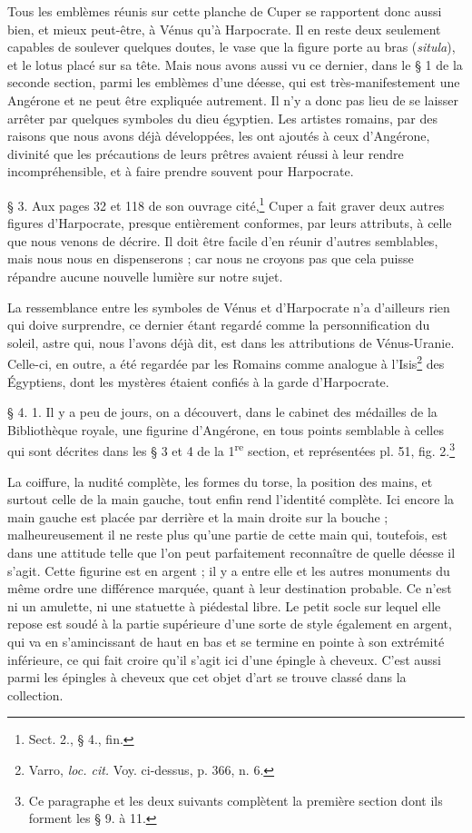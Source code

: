 \documentclass[a4paper, 11pt, oneside, polutonikogreek, french]{article}
\begin{document}
Tous les emblèmes réunis sur cette planche de Cuper se rapportent donc aussi bien, et mieux peut-être, à Vénus qu'à Harpocrate. Il en reste deux seulement capables de soulever quelques doutes, le vase que la figure porte au bras (\emph{situla}), et le lotus placé sur sa tête. Mais nous avons aussi vu ce dernier, dans le § 1 de la seconde section, parmi les emblèmes d'une déesse, qui est très-manifestement une Angérone et ne peut être expliquée autrement. Il n'y a donc pas lieu de se laisser arrêter par quelques symboles du dieu égyptien. Les artistes romains, par des raisons que nous avons déjà développées, les ont ajoutés à ceux d'Angérone, divinité que les précautions de leurs prêtres avaient réussi à leur rendre incompréhensible, et à faire prendre souvent pour Harpocrate.

§ 3. Aux pages 32 et 118 de son ouvrage cité,\footnote{Sect. 2., § 4., fin.} Cuper a fait graver deux autres figures d'Harpocrate, presque entièrement conformes, par leurs attributs, à celle que nous venons de décrire. Il doit être facile d'en réunir d'autres semblables, mais nous nous en dispenserons ; car nous ne croyons pas que cela puisse répandre aucune nouvelle lumière sur notre sujet.

La ressemblance entre les symboles de Vénus et d'Harpocrate n'a d'ailleurs rien qui doive surprendre, ce dernier étant regardé comme la personnification du soleil, astre qui, nous l'avons déjà dit, est dans les attributions de Vénus-Uranie. Celle-ci, en outre, a été regardée par les Romains comme analogue à l'Isis\footnote{Varro, \emph{loc. cit.} Voy. ci-dessus, p. 366, n. 6.} des Égyptiens, dont les mystères étaient confiés à la garde d'Harpocrate.

§ 4. 1. Il y a peu de jours, on a découvert, dans le cabinet des médailles de la Bibliothèque royale, une figurine d'Angérone, en tous points semblable à celles qui sont décrites dans les § 3 et 4 de la 1\textsuperscript{re} section, et représentées pl. 51, fig. 2.\footnote{Ce paragraphe et les deux suivants complètent la première section dont ils forment les § 9. à 11.}

La coiffure, la nudité complète, les formes du torse, la position des mains, et surtout celle de la main gauche, tout enfin rend l'identité complète. Ici encore la main gauche est placée par derrière et la main droite sur la bouche ; malheureusement il ne reste plus qu'une partie de cette main qui, toutefois, est dans une attitude telle que l'on peut parfaitement reconnaître de quelle déesse il s'agit. Cette figurine est en argent ; il y a entre elle et les autres monuments du même ordre une différence marquée, quant à leur destination probable. Ce n'est ni un amulette, ni une statuette à piédestal libre. Le petit socle sur lequel elle repose est soudé à la partie supérieure d'une sorte de style également en argent, qui va en s'amincissant de haut en bas et se termine en pointe à son extrémité inférieure, ce qui fait croire qu'il s'agit ici d'une épingle à cheveux. C'est aussi parmi les épingles à cheveux que cet objet d'art se trouve classé dans la collection.
\end{document}

